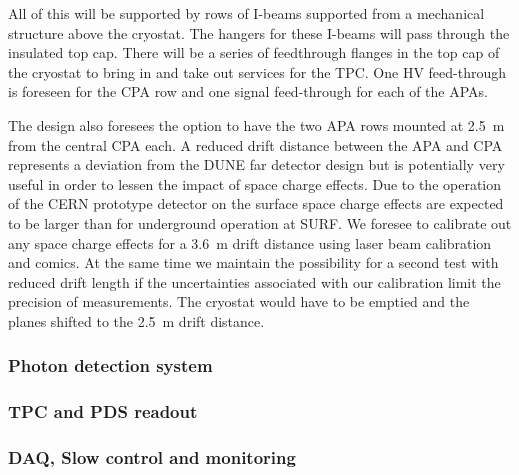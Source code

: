 All of this will be supported by rows of I-beams supported from a mechanical structure above the cryostat.  The hangers for these I-beams will pass through the insulated top cap.  There will be a series of feedthrough flanges in the top cap of the cryostat to bring in and take out services for the TPC.  One HV feed-through is foreseen for the CPA row and one signal feed-through for each of the APAs.

The design also foresees the option to have the two APA rows mounted at 2.5~m from the central CPA each.
A reduced drift distance between the APA and CPA represents a deviation from the DUNE far detector design but is potentially very
useful in order to lessen the impact of space charge effects.
Due to the operation of the CERN prototype detector on the surface space charge 
 effects are expected to be larger than for underground operation at SURF.
We foresee to calibrate out any space charge effects for a 3.6~m drift distance using laser beam calibration and comics. 
At the same time we maintain the  possibility for a second test with reduced drift length if the uncertainties associated 
with our calibration limit the precision of measurements.
The cryostat would have to be emptied and the planes shifted to the 2.5~m drift distance.
 









\subsubsection{Photon detection system}


\subsubsection{TPC and PDS readout}


\subsubsection{DAQ, Slow control and monitoring}





